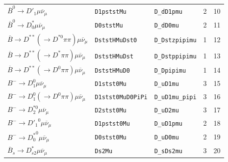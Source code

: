 \begin{table}[!htb]
\begin{tabular}{lllrr}
 $\overline{B}^0 \rightarrow D'_1 \mu \overline{\nu}_\mu$                             & \texttt{D1pststMu}                & \texttt{D\_dD1pmu}         &                     2 &               10 \\
 $\overline{B}^0 \rightarrow D^*_0 \mu \overline{\nu}_\mu$                            & \texttt{D0ststMu}                 & \texttt{D\_dD0mu}          &                     2 &               11 \\
 $\overline{B} \rightarrow D^{**} (\rightarrow D^{*0} \pi\pi) \mu \overline{\nu}_\mu$ & \texttt{DststHMuDst0}             & \texttt{D\_Dstzpipimu}     &                     1 &               12 \\
 $\overline{B} \rightarrow D^{**} (\rightarrow D^* \pi\pi) \mu \overline{\nu}_\mu$    & \texttt{DststHMuDst}              & \texttt{D\_Dstppipimu}     &                     1 &               13 \\
 $\overline{B} \rightarrow D^{**} (\rightarrow D^0 \pi\pi) \mu \overline{\nu}_\mu$    & \texttt{DststHMuD0}               & \texttt{D\_Dpipimu}        &                     1 &               14 \\
 $B^- \rightarrow D_1^0 \mu \overline{\nu}_\mu$                                       & \texttt{D1stst0Mu}                & \texttt{D\_uD1mu}          &                     3 &               15 \\
 $B^- \rightarrow D_1^0 (\rightarrow D^0 \pi\pi) \mu \overline{\nu}_\mu$              & \texttt{D1stst0MuD0PiPi}          & \texttt{D\_uD1mu\_pipi}    &                     3 &               16 \\
 $B^- \rightarrow D_2^{*0} \mu \overline{\nu}_\mu$                                    & \texttt{D2stst0Mu}                & \texttt{D\_uD2mu}          &                     3 &               17 \\
 $B^- \rightarrow {D'_1}^0 \mu \overline{\nu}_\mu$                                    & \texttt{D1pstst0Mu}               & \texttt{D\_uD1pmu}         &                     2 &               18 \\
 $B^- \rightarrow {D^*_0}^0 \mu \overline{\nu}_\mu$                                   & \texttt{D0stst0Mu}                & \texttt{D\_uD0mu}          &                     2 &               19 \\
 $\overline{B}_s \rightarrow D_{s2}^* \mu \overline{\nu}_\mu$                         & \texttt{Ds2Mu}                    & \texttt{D\_sDs2mu}         &                     3 &               20 \\

\end{tabular}
\end{table}

